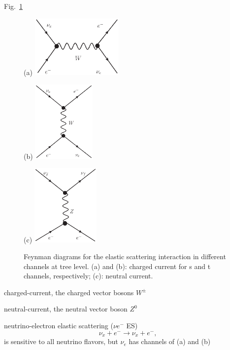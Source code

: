 Fig.~\ref{fig:feynman-es}
\begin{figure}[htbp]
	\centering
	\begin{minipage}[t]{0.45\textwidth}{(a)}
		\centering
		\includegraphics[width=4.5cm]{charged-1.eps}
	\end{minipage}
	\begin{minipage}[t]{0.3\textwidth}{(b)}
		\centering
		\includegraphics[height=4cm]{charged.eps}
	\end{minipage}
	\begin{minipage}[t]{0.4\textwidth}{(c)}
		\centering
		\includegraphics[height=4cm]{neutral.eps}
	\end{minipage}
	\caption[Feynman diagrams for the elastic scattering interaction in different channels at tree level.]{Feynman diagrams for the elastic scattering interaction in different channels at tree level. (a) and (b): charged current for s and t channels, respectively; (c): neutral current.}
	\label{fig:feynman-es}
\end{figure}

charged-current, the charged vector bosons $W^\pm$ 

neutral-current, the neutral vector boson $Z^0$


neutrino-electron elastic scattering ($\nu e^-$ ES)
\begin{equation}
\nu_x + e^{-}\to\nu_x+e^-,
\end{equation}
is sensitive to all neutrino flavors, but $\nu_e$ has channels of (a) and (b)

